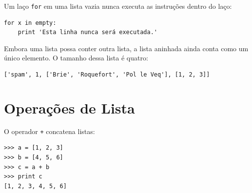 
Um laço {\tt for} em uma lista vazia nunca executa as instruções dentro do laço:

\beforeverb
\begin{verbatim}
for x in empty:
    print 'Esta linha nunca será executada.'
\end{verbatim}
\afterverb
%

Embora uma lista possa conter outra lista, a lista aninhada ainda conta
como um único elemento. O tamanho dessa lista é quatro:


\beforeverb
\begin{verbatim}
['spam', 1, ['Brie', 'Roquefort', 'Pol le Veq'], [1, 2, 3]]
\end{verbatim}
\afterverb

\section{Operações de Lista}

O operador {\tt +} concatena listas:


\beforeverb
\begin{verbatim}
>>> a = [1, 2, 3]
>>> b = [4, 5, 6]
>>> c = a + b
>>> print c
[1, 2, 3, 4, 5, 6]
\end{verbatim}
\afterverb
%

